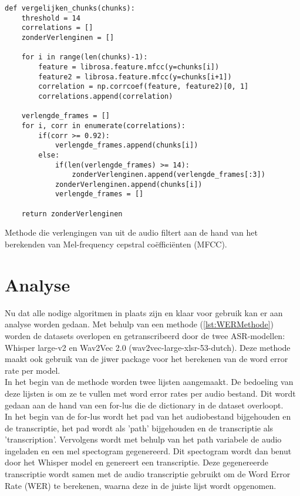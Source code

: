 \begin{listing}[H]
    \begin{verbatim}
def vergelijken_chunks(chunks):
    threshold = 14
    correlations = []
    zonderVerlenginen = []
    
    for i in range(len(chunks)-1):
        feature = librosa.feature.mfcc(y=chunks[i])
        feature2 = librosa.feature.mfcc(y=chunks[i+1])
        correlation = np.corrcoef(feature, feature2)[0, 1]
        correlations.append(correlation)
    
    verlengde_frames = []
    for i, corr in enumerate(correlations):
        if(corr >= 0.92):
            verlengde_frames.append(chunks[i])
        else:
            if(len(verlengde_frames) >= 14):
                zonderVerlenginen.append(verlengde_frames[:3])
            zonderVerlenginen.append(chunks[i])
            verlengde_frames = []
    
    return zonderVerlenginen
    \end{verbatim}
    \caption{Methode die verlengingen van uit de audio filtert aan de hand van het berekenden van Mel-frequency cepstral coëfficiënten (MFCC).}
\label{lst:vlgchunks}
\end{listing}
\section{Analyse}
Nu dat alle nodige algoritmen in plaats zijn en klaar voor gebruik kan er aan analyse worden gedaan. Met behulp van een methode (\ref{lst:WERMethode}) worden de datasets overlopen en getranscribeerd door de twee ASR-modellen: Whisper large-v2 en Wav2Vec 2.0 (wav2vec-large-xlsr-53-dutch). Deze methode maakt ook gebruik van de jiwer package voor het berekenen van de word error rate per model.\\

In het begin van de methode worden twee lijsten aangemaakt. De bedoeling van deze lijsten is om ze te vullen met word error rates per audio bestand. Dit wordt gedaan aan de hand van een for-lus die de dictionary in de dataset overloopt.\\

In het begin van de for-lus wordt het pad van het audiobestand bijgehouden en de transcriptie, het pad wordt als 'path' bijgehouden en de transcriptie als 'transcription'. Vervolgens wordt met behulp van het path variabele de audio ingeladen en een mel spectogram gegenereerd. Dit spectogram wordt dan benut door het Whisper model en genereert een transcriptie. Deze gegenereerde transcriptie wordt samen met de audio transcriptie gebruikt om de Word Error Rate (WER) te berekenen, waarna deze in de juiste lijst wordt opgenomen.\\

